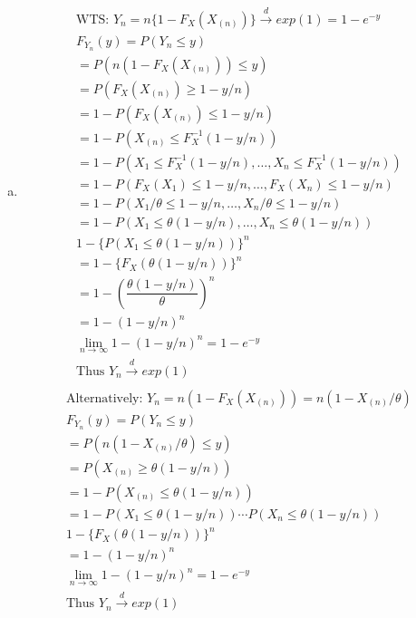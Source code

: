 \documentclass{article}
\newcommand{\cd}{\overset{d}{\to}}
\newcommand{\limn}{\lim_{n \to \infty}}
\begin{document}
\begin{flushleft}
\begin{enumerate}[(a)]
	\item 
\begin{multline*}\\
\text{WTS: } Y_n=n\{1-F_X(X_{(n)})\}\cd exp(1)=1-e^{-y}\\
F_{Y_n}(y)=P(Y_n\leq y)\\
=P(n(1-F_X(X_{(n)}))\leq y)\\
=P(F_X(X_{(n)})\geq 1-y/n)\\
=1-P(F_X(X_{(n)})\leq 1-y/n)\\
=1-P(X_{(n)}\leq F_X^{-1}(1-y/n))\\
=1-P(X_1\leq F_X^{-1}(1-y/n),\dots,X_n\leq F_X^{-1}(1-y/n))\\
=1-P(F_X(X_1)\leq 1-y/n,\dots,F_X(X_n)\leq 1-y/n)\\
=1-P(X_1/\theta\leq 1-y/n,\dots,X_n/\theta\leq 1-y/n)\\
=1-P(X_1\leq \theta(1-y/n),\dots,X_n\leq \theta(1-y/n))\\
1-\{P(X_1\leq \theta(1-y/n))\}^n\\
=1-\{F_X(\theta(1-y/n))\}^n\\
=1-\left(\dfrac{\theta(1-y/n)}{\theta}\right)^n\\
=1-(1-y/n)^n\\
\limn 1-(1-y/n)^n=1-e^{-y}\\
\text{Thus } Y_n \cd exp(1)\\
\end{multline*}
\begin{multline*}
\text{Alternatively: } Y_n=n(1-F_X(X_{(n)}))=n(1-X_{(n)}/\theta)\\
F_{Y_n}(y)=P(Y_n\leq y)\\
=P(n(1-X_{(n)}/\theta) \leq y)\\
=P(X_{(n)} \geq \theta(1-y/n))\\
=1-P(X_{(n)} \leq \theta(1-y/n))\\
=1-P(X_1\leq \theta(1-y/n))\cdots P(X_n\leq \theta(1-y/n))\\
1-\{F_{X}(\theta(1-y/n))\}^n\\
=1-(1-y/n)^n\\
\limn 1-(1-y/n)^n=1-e^{-y}\\
\text{Thus } Y_n \cd exp(1)\\
\end{multline*}	
\end{enumerate}

\end{flushleft}
\end{document}
